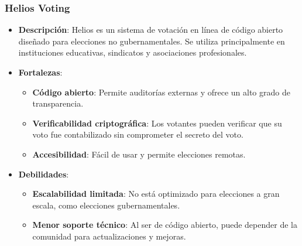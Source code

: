 \documentclass{article}
\begin{document}
\subsubsection{Helios Voting}
\begin{itemize}
    \item \textbf{Descripción}: Helios es un sistema de votación en línea de código abierto diseñado para elecciones no gubernamentales. Se utiliza principalmente en instituciones educativas, sindicatos y asociaciones profesionales.
    \item \textbf{Fortalezas}:
    \begin{itemize}
        \item \textbf{Código abierto}: Permite auditorías externas y ofrece un alto grado de transparencia.
        \item \textbf{Verificabilidad criptográfica}: Los votantes pueden verificar que su voto fue contabilizado sin comprometer el secreto del voto.
        \item \textbf{Accesibilidad}: Fácil de usar y permite elecciones remotas.
    \end{itemize}
    \item \textbf{Debilidades}:
    \begin{itemize}
        \item \textbf{Escalabilidad limitada}: No está optimizado para elecciones a gran escala, como elecciones gubernamentales.
        \item \textbf{Menor soporte técnico}: Al ser de código abierto, puede depender de la comunidad para actualizaciones y mejoras.
    \end{itemize}
\end{itemize}
\end{document}
